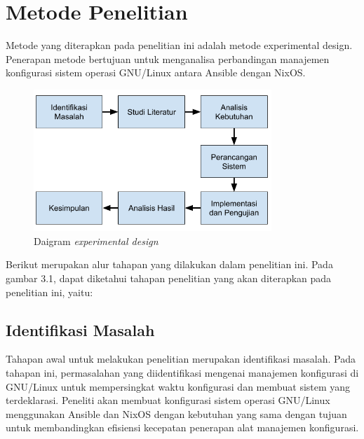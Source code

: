 \documentclass[10pt,]{report}
\begin{document}
\section{Metode Penelitian}
\begin{adjustwidth}{7mm}{}
	\vspace{-3mm}
	\hspace\parindent
	Metode yang diterapkan pada penelitian ini adalah metode experimental design.
	Penerapan metode bertujuan untuk menganalisa perbandingan manajemen
	konfigurasi sistem operasi GNU/Linux antara Ansible dengan NixOS.

	\begin{figure}[h]
		\centering
		\includegraphics[width=0.8\textwidth]{images/metpen.png}
		\caption{Daigram \textit{experimental design}}
	\end{figure}

\end{adjustwidth}
\begin{adjustwidth}{7mm}{}
	\hspace\parindent
	Berikut merupakan alur tahapan yang dilakukan dalam penelitian ini.
	Pada gambar 3.1, dapat diketahui tahapan penelitian yang akan diterapkan
	pada penelitian ini, yaitu:
\end{adjustwidth}
\begin{adjustwidth}{7mm}{}
	\subsection{Identifikasi Masalah}
	\vspace{-3mm}
	\begin{adjustwidth}{6mm}{}
		Tahapan awal untuk melakukan penelitian merupakan identifikasi masalah. Pada
		tahapan ini, permasalahan yang diidentifikasi mengenai manajemen konfigurasi
		di GNU/Linux untuk mempersingkat waktu konfigurasi dan membuat sistem yang
		terdeklarasi. Peneliti akan membuat konfigurasi sistem operasi GNU/Linux
		menggunakan Ansible dan NixOS dengan kebutuhan yang sama dengan tujuan untuk
		membandingkan efisiensi kecepatan penerapan alat manajemen konfigurasi.
	\end{adjustwidth}
\end{adjustwidth}
\end{document}
